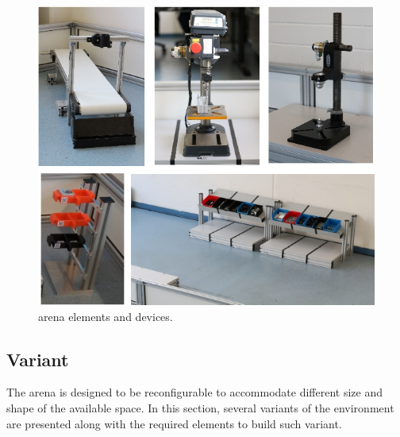 \begin{figure}[htb]
 \begin{center}
 \includegraphics[width=14cm]{pics/atwork/arena_elements/AtWorkSpecsElements.jpg} 
 \end{center}
 \caption{\erlir arena elements and devices.}
 \label{fig:TaskRelatedObjects}
\end{figure}

\clearpage
\subsection{Variant}
	The arena is designed to be reconfigurable to accommodate different size and shape of the available space. 
	In this section, several variants of the environment are presented along with the required elements to build such variant.


